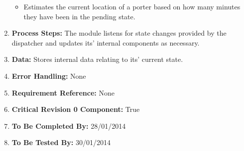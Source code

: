 \documentclass[paper=letter, fontsize=10pt]{scrartcl}
\numberwithin{equation}{section}		%
\numberwithin{figure}{section}			%
\numberwithin{table}{section}				%
\begin{document}
\begin{enumerate}[]
\begin{itemize}
			\item Estimates the current location of a porter based on how many minutes they have been in the pending state.
		\end{itemize}
	\item \textbf{Process Steps:} The module listens for state changes provided by the dispatcher and updates its' internal components as necessary.
	\item \textbf{Data:} Stores internal data relating to its' current state.
	\item \textbf{Error Handling:} None
	\item \textbf{Requirement Reference:} None
	\item \textbf{Critical Revision 0 Component:} True
	\item \textbf{To Be Completed By:} 28/01/2014
	\item \textbf{To Be Tested By:} 30/01/2014
\end{enumerate}
\end{document}
